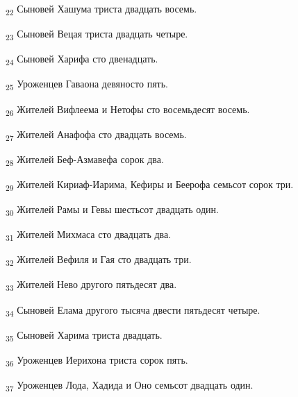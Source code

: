 \begin{tcolorbox}
\textsubscript{22} Сыновей Хашума триста двадцать восемь.
\end{tcolorbox}
\begin{tcolorbox}
\textsubscript{23} Сыновей Вецая триста двадцать четыре.
\end{tcolorbox}
\begin{tcolorbox}
\textsubscript{24} Сыновей Харифа сто двенадцать.
\end{tcolorbox}
\begin{tcolorbox}
\textsubscript{25} Уроженцев Гаваона девяносто пять.
\end{tcolorbox}
\begin{tcolorbox}
\textsubscript{26} Жителей Вифлеема и Нетофы сто восемьдесят восемь.
\end{tcolorbox}
\begin{tcolorbox}
\textsubscript{27} Жителей Анафофа сто двадцать восемь.
\end{tcolorbox}
\begin{tcolorbox}
\textsubscript{28} Жителей Беф-Азмавефа сорок два.
\end{tcolorbox}
\begin{tcolorbox}
\textsubscript{29} Жителей Кириаф-Иарима, Кефиры и Беерофа семьсот сорок три.
\end{tcolorbox}
\begin{tcolorbox}
\textsubscript{30} Жителей Рамы и Гевы шестьсот двадцать один.
\end{tcolorbox}
\begin{tcolorbox}
\textsubscript{31} Жителей Михмаса сто двадцать два.
\end{tcolorbox}
\begin{tcolorbox}
\textsubscript{32} Жителей Вефиля и Гая сто двадцать три.
\end{tcolorbox}
\begin{tcolorbox}
\textsubscript{33} Жителей Нево другого пятьдесят два.
\end{tcolorbox}
\begin{tcolorbox}
\textsubscript{34} Сыновей Елама другого тысяча двести пятьдесят четыре.
\end{tcolorbox}
\begin{tcolorbox}
\textsubscript{35} Сыновей Харима триста двадцать.
\end{tcolorbox}
\begin{tcolorbox}
\textsubscript{36} Уроженцев Иерихона триста сорок пять.
\end{tcolorbox}
\begin{tcolorbox}
\textsubscript{37} Уроженцев Лода, Хадида и Оно семьсот двадцать один.
\end{tcolorbox}
